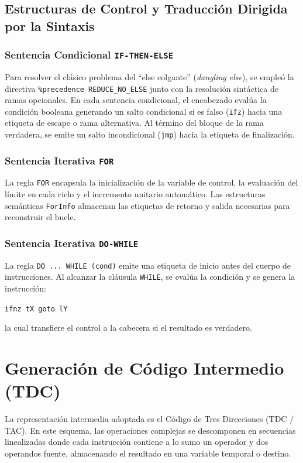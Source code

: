 \documentclass[conference]{IEEEtran}
\begin{document}
\subsection{Estructuras de Control y Traducción Dirigida por la Sintaxis}
\subsubsection{Sentencia Condicional \texttt{IF-THEN-ELSE}}
Para resolver el clásico problema del ``else colgante'' (\textit{dangling else}), se empleó la directiva \texttt{\%precedence REDUCE\_NO\_ELSE} junto con la resolución sintáctica de ramas opcionales. En cada sentencia condicional, el encabezado evalúa la condición booleana generando un salto condicional si es falso (\texttt{ifz}) hacia una etiqueta de escape o rama alternativa. Al término del bloque de la rama verdadera, se emite un salto incondicional (\texttt{jmp}) hacia la etiqueta de finalización.

\subsubsection{Sentencia Iterativa \texttt{FOR}}
La regla \texttt{FOR} encapsula la inicialización de la variable de control, la evaluación del límite en cada ciclo y el incremento unitario automático. Las estructuras semánticas \texttt{ForInfo} almacenan las etiquetas de retorno y salida necesarias para reconstruir el bucle.

\subsubsection{Sentencia Iterativa \texttt{DO-WHILE}}
La regla \texttt{DO ... WHILE (cond)} emite una etiqueta de inicio antes del cuerpo de instrucciones. Al alcanzar la cláusula \texttt{WHILE}, se evalúa la condición y se genera la instrucción:
\begin{center}
\texttt{ifnz tX goto lY}
\end{center}
la cual transfiere el control a la cabecera si el resultado es verdadero.

\section{Generación de Código Intermedio (TDC)}
La representación intermedia adoptada es el Código de Tres Direcciones (TDC / TAC). En este esquema, las operaciones complejas se descomponen en secuencias linealizadas donde cada instrucción contiene a lo sumo un operador y dos operandos fuente, almacenando el resultado en una variable temporal o destino.
\end{document}
